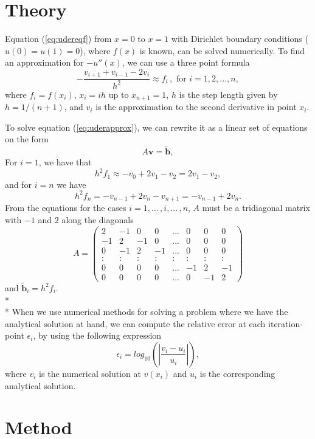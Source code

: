 \documentclass[norsk,a4paper,12pt]{article}
\begin{document}
\section{Theory}
Equation (\ref{eq:udereqf}) from $x=0$ to $x=1$ with Dirichlet boundary conditions ($u(0)=u(1)=0$), where $f(x)$ is known, can be solved numerically. To find an approximation for $-u''(x)$, we can use a three point formula
\begin{equation}
-\frac{v_{i+1}+v_{i-1} - 2v_i}{h^2} \approx f_i\, , \text{ for } i = 1, 2, ..., n,
\label{eq:uderapprox}
\end{equation}
where $f_i=f(x_i)$, $x_i = ih$ up to $x_{n+1} = 1$, $h$ is the step length given by $h=1/(n+1)$, and $v_i$ is the approximation to the second derivative in point $x_i$. 

To solve equation (\ref{eq:uderapprox}), we can rewrite it as a linear set of equations on the form \begin{equation}
A\textbf{v} = \tilde{\textbf{b}},
\label{eq:Aveqb}
\end{equation} For $i=1$, we have that 
$$h^2f_1 \approx -v_0 + 2v_1 - v_2 = 2v_1-v_2,$$
and for $i=n$ we have 
$$h^2f_n = -v_{n-1} + 2v_n - v_{n+1} = -v_{n-1} + 2v_n.$$ From the equations for the cases $i=1,...\,,i,...\,,n$, $A$ must be a tridiagonal matrix with $-1$ and $2$ along the diagonals
$$A = \begin{pmatrix}
2&-1&0&0&...&0&0&0\\
-1&2&-1&0&...&0&0&0\\
0&-1&2&-1&...&0&0&0\\
:&:&:&:& : &:&:&:\\
0&0&0&0&...&-1&2&-1\\
0&0&0&0&...&0&-1&2
\end{pmatrix}$$
and $\tilde{\textbf{b}}_i = h^2f_i$.
\\* \\* \noindent
When we use numerical methods for solving a problem where we have the analytical solution at hand, we can compute the relative error at each iteration-point $\epsilon _i$, by using the following expression
\begin{equation}
\epsilon _i = log_{10}\left(\left|\frac{v_i-u_i}{u_i}\right|\right),
\label{epsilon_i}
\end{equation}
where $v_i$ is the numerical solution at $v(x_i)$ and $u_i$ is the corresponding analytical solution. 
\section{Method}
\end{document}
